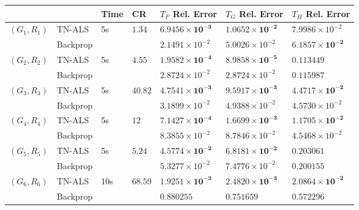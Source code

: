 \documentclass[11pt,a4paper,openright,oneside]{book}
\numberwithin{equation}{section}
\begin{document}
{\begin{figure}
    \centering
\renewcommand{\arraystretch}{1.25}
\begin{tabular}{lllllll}
\hline
          &          & Time & CR & $T_F$ Rel. Error & $T_G$ Rel. Error & $T_H$ Rel. Error\\ \hline
    $(G_1, R_1)$ & TN-ALS   & 5s & $1.34$ & $\mathbf{6.9456 \times 10^{-3}}$            & $\mathbf{1.0652 \times 10^{-2}}$            & $7.9986 \times 10^{-2}$           \\
                 & Backprop &  & & $2.1491 \times 10^{-2}$                     & $5.0026 \times 10^{-2}$                     & $\mathbf{6.1857 \times 10^{-2}}$          \\ \hline
    $(G_2, R_2)$ & TN-ALS   & 5s & $4.55$ & $\mathbf{1.9582 \times 10^{-4}}$            & $\mathbf{8.9858 \times 10^{-5}}$        & $\mathbf{0.113449}$           \\
                 & Backprop & &  & $2.8724 \times 10^{-2}$                     & $2.8724 \times 10^{-2}$                     & $0.115987$           \\ \hline
    $(G_3, R_3)$ & TN-ALS   & 5s & $40.82$ & $\mathbf{4.7541 \times 10^{-3}}$            & $\mathbf{9.5917 \times 10^{-3}}$        & $\mathbf{4.4717 \times 10^{-2}}$           \\
                 & Backprop & & & $3.1899 \times 10^{-2}$                     & $4.9388 \times 10^{-2}$                     & $4.5730 \times 10^{-2}$           \\ \hline
    $(G_4, R_4)$ & TN-ALS   & 5s & $12$ & $\mathbf{7.1427 \times 10^{-4}}$            & $\mathbf{1.6699 \times 10^{-3}}$        & $\mathbf{1.1705 \times 10^{-2}}$           \\
                 & Backprop & & & $8.3855 \times 10^{-2}$                     & $8.7846 \times 10^{-2}$                     & $4.5468 \times 10^{-2}$           \\ \hline
    $(G_5, R_5)$ & TN-ALS   & 5s & $5.24$ & $\mathbf{4.5774 \times 10^{-2}}$            & $\mathbf{6.8181 \times 10^{-2}}$        & $0.203061$           \\
                 & Backprop & & & $5.3277 \times 10^{-2}$                     & $7.4776 \times 10^{-2}$                     & $\mathbf{0.200155}$           \\ \hline
    $(G_6, R_6)$ & TN-ALS   & 10s & $68.59$ & $\mathbf{1.9251 \times 10^{-3}}$           & $\mathbf{2.4820 \times 10^{-3}}$        & $\mathbf{2.0864 \times 10^{-2}}$           \\
                 & Backprop & & & $0.880255$                                 & $0.751659$                                  & $0.572296$         \\ \hline
\end{tabular}


\end{figure}}
\end{document}
